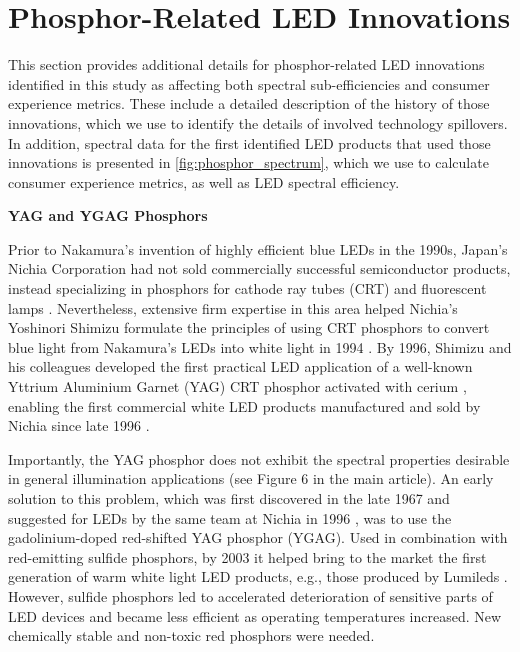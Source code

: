 \documentclass[parskip=full]{article}
\begin{document}
\clearpage
\section{Phosphor-Related LED Innovations}
\label{sec:innovation_phosphor}

This section provides additional details for phosphor-related LED innovations identified in this study as affecting both spectral sub-efficiencies and consumer experience metrics. These include a detailed description of the history of those innovations, which we use to identify the details of involved technology spillovers. In addition, spectral data for the first identified LED products that used those innovations is presented in \cref{fig:phosphor_spectrum}, which we use to calculate consumer experience metrics, as well as LED spectral efficiency.

\textbf{YAG and YGAG Phosphors}

Prior to Nakamura’s invention of highly efficient blue LEDs in the 1990s, Japan’s Nichia Corporation had not sold commercially successful semiconductor products, instead specializing in phosphors for cathode ray tubes (CRT) and fluorescent lamps \cite{nakamura2013blue}  . Nevertheless, extensive firm expertise in this area helped Nichia’s Yoshinori Shimizu formulate the principles of using CRT phosphors to convert blue light from Nakamura’s LEDs into white light in 1994 \cite{shimizu1994sheet}\cite{cho2017white}. By 1996, Shimizu and his colleagues developed \cite{bando1996}\cite{shimizu1999light} the first practical LED application of a well-known Yttrium Aluminium Garnet (YAG) CRT phosphor activated with cerium \cite{blasse1967new}, enabling the first commercial white LED products manufactured and sold by Nichia since late 1996 \cite{bando1998development}\cite{cho2017white}. 

Importantly, the YAG phosphor does not exhibit the spectral properties desirable in general illumination applications (see Figure 6 in the main article). An early solution to this problem, which was first discovered in the late 1967 \cite{holloway1969optical} and suggested for LEDs by the same team at Nichia in 1996 \cite{bando1998development}\cite{shimizu1999light}, was to use the gadolinium-doped red-shifted YAG phosphor (YGAG). Used in combination with red-emitting sulfide phosphors, by 2003 it helped bring to the market the first generation of warm white light LED products, e.g., those produced by Lumileds \cite{Mueller2002}. However, sulfide phosphors led to accelerated deterioration of sensitive parts of LED devices and became less efficient as operating temperatures increased. New chemically stable and non-toxic red phosphors were needed. 
\end{document}
